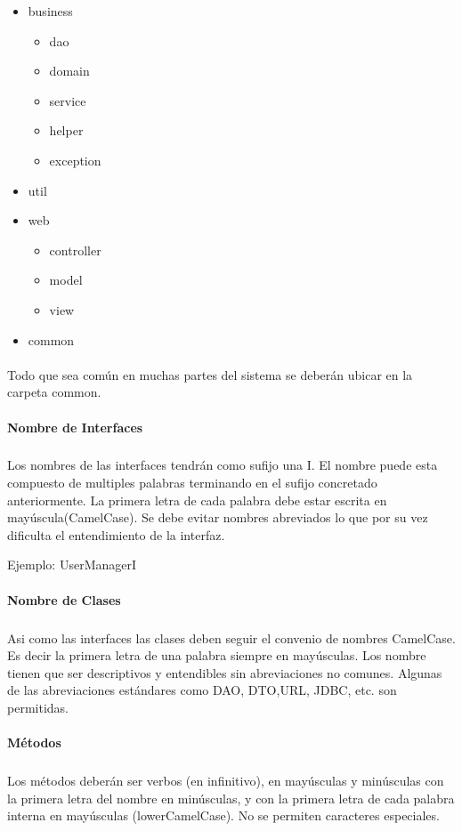 \begin{itemize}
\item
  business
  \begin{itemize}
  \item
    dao
  \item
    domain
  \item
    service
  \item
    helper
  \item
    exception
  \end{itemize}
\item
  util
\item
  web
  \begin{itemize}
  \item
    controller
  \item
    model
  \item
    view
  \end{itemize}
\item
  common
\end{itemize}

\paragraph{}
Todo que sea común en muchas partes del sistema se deberán ubicar en
la carpeta common.

\paragraph{Nombre de Interfaces}
\subparagraph{}
Los nombres de las interfaces tendrán como sufijo una I. El nombre
puede esta compuesto de multiples palabras terminando en el sufijo
concretado anteriormente. La primera letra de cada palabra debe estar
escrita en mayúscula(CamelCase). Se debe evitar nombres abreviados lo
que por su vez dificulta el entendimiento de la interfaz.

Ejemplo: UserManagerI

\paragraph{Nombre de Clases}
\subparagraph{}
Asi como las interfaces las clases deben seguir el convenio de nombres
CamelCase. Es decir la primera letra de una palabra siempre en
mayúsculas. Los nombre tienen que ser descriptivos y entendibles sin
abreviaciones no comunes. Algunas de las abreviaciones estándares como
DAO, DTO,URL, JDBC, etc. son permitidas.

\paragraph{Métodos}
\subparagraph{}
Los métodos deberán ser verbos (en infinitivo), en mayúsculas y
minúsculas con la primera letra del nombre en minúsculas, y con la
primera letra de cada palabra interna en mayúsculas
(lowerCamelCase). No se permiten caracteres especiales.

